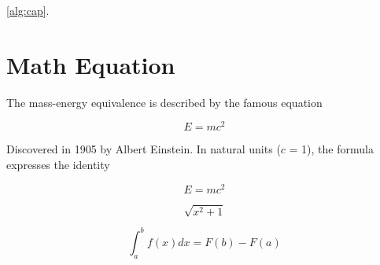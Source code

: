 \lipsum[1-1] \ref{alg:cap}.

\section{Math Equation}

The mass-energy equivalence is described by the famous equation

\[E=mc^2\]

Discovered in 1905 by Albert Einstein.
In natural units ($c$ = 1), the formula expresses the identity

\begin{equation}
  E=mc^2
\end{equation}

\begin{displaymath}
  \sqrt{x^2+1}
\end{displaymath}


\begin{displaymath}
  \int_{a}^{b} f(x)dx = F(b) - F(a)
\end{displaymath}

